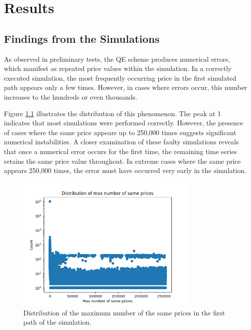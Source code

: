 \chapter{Results}
\label{sec:results}

\section{Findings from the Simulations}
As observed in preliminary tests, the QE scheme produces numerical errors, which manifest as repeated price values within the simulation. In a correctly executed simulation, the most frequently occurring price in the first simulated path appears only a few times. However, in cases where errors occur, this number increases to the hundreds or even thousands.

Figure \ref{fig:max_number_of_same_prices_distribution} illustrates the distribution of this phenomenon. The peak at 1 indicates that most simulations were performed correctly. However, the presence of cases where the same price appears up to 250,000 times suggests significant numerical instabilities. A closer examination of these faulty simulations reveals that once a numerical error occurs for the first time, the remaining time series retains the same price value throughout. In extreme cases where the same price appears 250,000 times, the error must have occurred very early in the simulation.

\begin{figure}
    \centering
    \includegraphics[width=0.8\textwidth]{img/max_number_of_same_prices_distribution.png}
    \caption{Distribution of the maximum number of the same prices in the first path of the simulation.}
    \label{fig:max_number_of_same_prices_distribution}
\end{figure}

